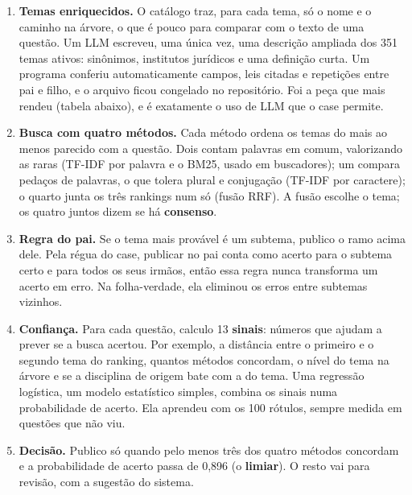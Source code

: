 \documentclass[11pt,a4paper]{article}
\newcommand{\bd}[1]{\textbf{#1}}
\begin{document}
\begin{enumerate}
\item \bd{Temas enriquecidos.} O catálogo traz, para cada tema, só o nome e o caminho na árvore,
      o que é pouco para comparar com o texto de uma questão. Um LLM escreveu, uma única vez, uma
      descrição ampliada dos 351 temas ativos: sinônimos, institutos jurídicos e uma definição
      curta. Um programa conferiu automaticamente campos, leis citadas e repetições entre pai e
      filho, e o arquivo ficou congelado no repositório. Foi a peça que mais rendeu (tabela
      abaixo), e é exatamente o uso de LLM que o case permite.
\item \bd{Busca com quatro métodos.} Cada método ordena os temas do mais ao menos parecido com
      a questão. Dois contam palavras em comum, valorizando as raras (TF-IDF por palavra e o BM25,
      usado em buscadores); um compara pedaços de palavras, o que tolera plural e conjugação
      (TF-IDF por caractere); o quarto junta os três rankings num só (fusão RRF). A fusão escolhe
      o tema; os quatro juntos dizem se há \bd{consenso}.
\item \bd{Regra do pai.} Se o tema mais provável é um subtema, publico o ramo acima dele. Pela
      régua do case, publicar no pai conta como acerto para o subtema certo e para todos os seus
      irmãos, então essa regra nunca transforma um acerto em erro. Na folha-verdade, ela eliminou
      os erros entre subtemas vizinhos.
\item \bd{Confiança.} Para cada questão, calculo 13 \bd{sinais}: números que ajudam a prever se a
      busca acertou. Por exemplo, a distância entre o primeiro e o segundo tema do ranking, quantos
      métodos concordam, o nível do tema na árvore e se a disciplina de origem bate com a do tema.
      Uma regressão logística, um modelo estatístico simples, combina os sinais numa probabilidade
      de acerto. Ela aprendeu com os 100 rótulos, sempre medida em questões que não viu.
\item \bd{Decisão.} Publico só quando pelo menos três dos quatro métodos concordam e a
      probabilidade de acerto passa de 0,896 (o \bd{limiar}). O resto vai para revisão, com a
      sugestão do sistema.
\end{enumerate}
\end{document}
